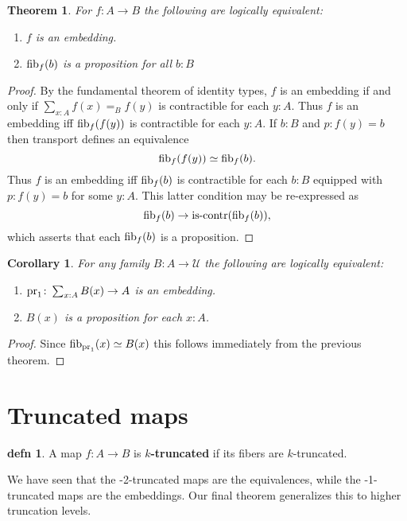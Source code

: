 \documentclass{amsart}
\theoremstyle{theorem}
\newtheorem*{thm}{Theorem}
\newtheorem*{cor}{Corollary}
\theoremstyle{definition}
\newtheorem*{defn}{defn}
\theoremstyle{remark}
\newcommand{\0}{\mathbbe{0}}
\newcommand{\1}{\mathbbe{1}}
\newcommand{\2}{\mathbbe{2}}
\newcommand{\3}{\mathbbe{3}}
\newcommand{\4}{\mathbbe{4}}
\newcommand{\term}[1]{{\textup{#1}}}
\newcommand{\type}[1]{{\textup{#1}}}
\newcommand{\pr}{\term{pr}}
\newcommand{\UU}{{\mathcal{U}}}
\newcommand{\iscontr}{\type{is-contr}}
\newcommand{\fib}{\type{fib}}
\begin{document}
\begin{thm} For $f : A \to B$ the following are logically equivalent:
\begin{enumerate}
\item $f$ is an embedding.
\item $\fib_f(b)$ is a proposition for all $b : B$
\end{enumerate}
\end{thm}
\begin{proof}
By the fundamental theorem of identity types, $f$ is an embedding if and only if $\sum_{x:A}f(x)=_B f(y)$ is contractible for each $y :A$. Thus $f$ is an embedding iff $\fib_f(f(y))$ is contractible for each $y : A$. If $b:B$ and $p : f(y) = b$ then transport defines an equivalence
\[ \fib_f(f(y)) \simeq \fib_f(b).\]
Thus $f$ is an embedding iff $\fib_f(b)$ is contractible for each $b : B$ equipped with $p : f(y) = b$ for some $y:A$. This latter condition may be re-expressed as \[ \fib_f(b) \to \iscontr(\fib_f(b)),\]
which asserts that each $\fib_f(b)$ is a proposition.
\end{proof}

\begin{cor} For any family $B : A \to \UU$ the following are logically equivalent:
\begin{enumerate}
\item $\pr_1 \colon \sum_{x:A} B(x) \to A$ is an embedding.
\item $B(x)$ is a proposition for each $x:A$.
\end{enumerate}
\end{cor}
\begin{proof}
Since $\fib_{\pr_1}(x) \simeq B(x)$ this follows immediately from the previous theorem.
\end{proof}

\section*{Truncated maps}

\begin{defn} A map $f \colon A \to B$ is \textbf{$k$-truncated} if its fibers are $k$-truncated.
\end{defn}

We have seen that the -2-truncated maps are the equivalences, while the -1-truncated maps are the embeddings. Our final theorem generalizes this to higher truncation levels.
\end{document}
